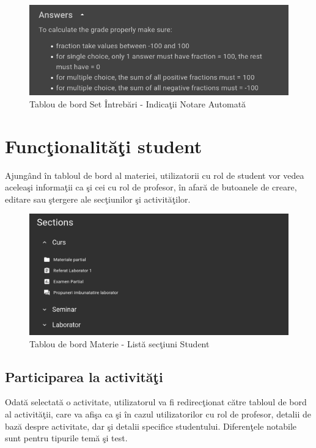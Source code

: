 \documentclass[12pt, a4paper, oneside, romanian]{teza-upb}
\begin{document}
\begin{figure}[H]
\centering
\includegraphics*[width=0.7\columnwidth]{tablou-de-bord-set-intrebari-indicatii-notare-automata}
\caption{Tablou de bord Set Întrebări - Indicaţii Notare Automată}
\label{tablou-de-bord-set-intrebari-indicatii-notare-automata}
\end{figure}

\section{Funcţionalităţi student}

Ajungând în tabloul de bord al materiei, utilizatorii cu rol de student vor vedea aceleaşi informaţii ca şi cei cu rol de profesor, în afară de butoanele de creare, editare sau ştergere ale secţiunilor şi activităţilor.

\begin{figure}[H]
\centering
\includegraphics*[width=0.7\columnwidth]{tablou-de-bord-materie-lista-sectiuni-student}
\caption{Tablou de bord Materie - Listă secţiuni Student}
\label{tablou-de-bord-materie-lista-sectiuni-student}
\end{figure}

\subsection{Participarea la activităţi}

Odată selectată o activitate, utilizatorul va fi redirecţionat către tabloul de bord al activităţii, care va afişa ca şi în cazul utilizatorilor cu rol de profesor, detalii de bază despre activitate, dar şi detalii specifice studentului. Diferenţele notabile sunt pentru tipurile temă şi test.
\end{document}
